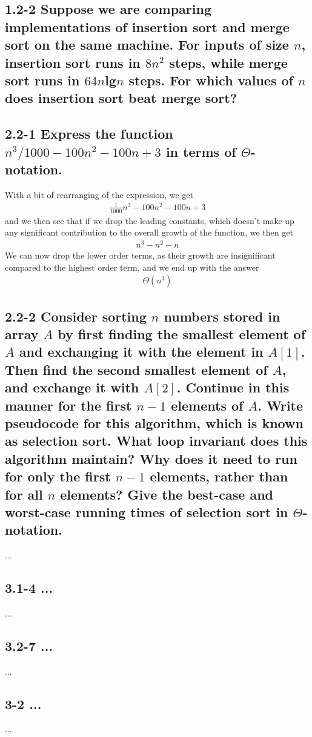 \documentclass[11pt,english]{article}
\begin{document}
\subsection*{1.2-2 \mdseries Suppose we are comparing implementations of
insertion sort and merge sort on the same machine. For inputs of size $n$,
insertion sort runs in $8n^2$ steps, while merge sort runs in $64n$lg$n$
steps. For which values of $n$ does insertion sort beat merge sort?}

\subsection*{2.2-1 \mdseries Express the function
$n^3/1000 - 100n^2 - 100n + 3$ in terms of $\Theta$-notation.}
With a bit of rearranging of the expression, we get
\begin{align}
	\frac{1}{1000} n^3 - 100n^2 - 100n + 3
\end{align}
and we then see that if we drop the leading constants, which doesn't make up
any significant contribution to the overall growth of the function, we then
get
\begin{align}
	n^3 - n^2 - n
\end{align}
We can now drop the lower order terms, as their growth are insignificant
compared to the highest order term, and we end up with the answer
\begin{align}
	\Theta(n^3)
\end{align}

\subsection*{2.2-2 \mdseries Consider sorting $n$ numbers stored in array $A$
by first finding the smallest element of $A$ and exchanging it with the
element in $A[1]$. Then find the second smallest element of $A$, and exchange
it with $A[2]$. Continue in this manner for the first $n-1$ elements of $A$.
Write pseudocode for this algorithm, which is known as
\textbf{selection sort}. What loop invariant does this algorithm maintain?
Why does it need to run for only the first $n-1$ elements, rather than for all
$n$ elements? Give the best-case and worst-case running times of selection
sort in $\Theta$-notation.}
...


\subsection*{3.1-4 \mdseries ...}
...

\subsection*{3.2-7 \mdseries ...}
...

\subsection*{3-2 \mdseries ...}
...
\end{document}
